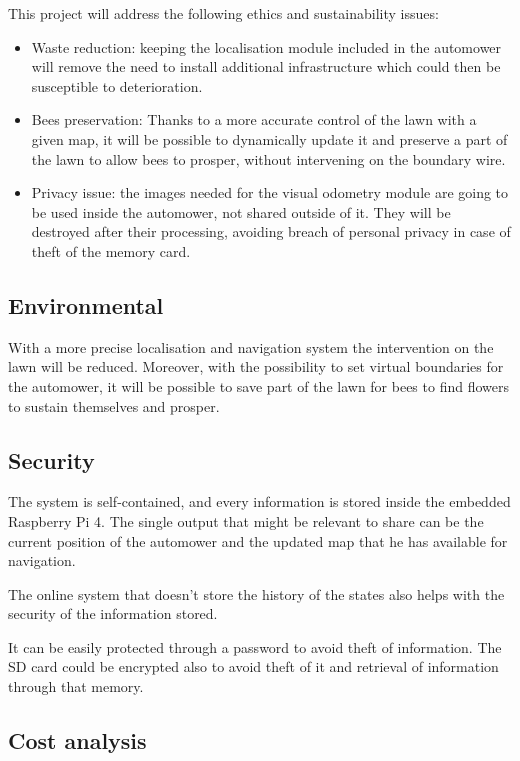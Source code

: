 \noindent This project will address the following ethics and sustainability issues:
\begin{itemize}
    \item Waste reduction: keeping the localisation module included in the automower will remove the need to install additional infrastructure which could then be susceptible to deterioration.
    \item Bees preservation: Thanks to a more accurate control of the lawn with a given map, it will be possible to dynamically update it and preserve a part of the lawn to allow bees to prosper, without intervening on the boundary wire.
    \item Privacy issue: the images needed for the visual odometry module are going to be used inside the automower, not shared outside of it. They will be destroyed after their processing, avoiding breach of personal privacy in case of theft of the memory card.
\end{itemize}

\subsection{Environmental}
\noindent
With a more precise localisation and navigation system the intervention on the lawn will be reduced.
Moreover, with the possibility to set virtual boundaries for the automower, it will be possible to save part of the lawn for bees to find flowers to sustain themselves and prosper.


\subsection{Security}
\noindent

The system is self-contained, and every information is stored inside the embedded Raspberry Pi 4. 
The single output that might be relevant to share can be the current position of the automower and the updated map that he has available for navigation.

The online system that doesn't store the history of the states also helps with the security of the information stored.

It can be easily protected through a password to avoid theft of information. 
The SD card could be encrypted also to avoid theft of it and retrieval of information through that memory.

\subsection{Cost analysis}
\noindent

